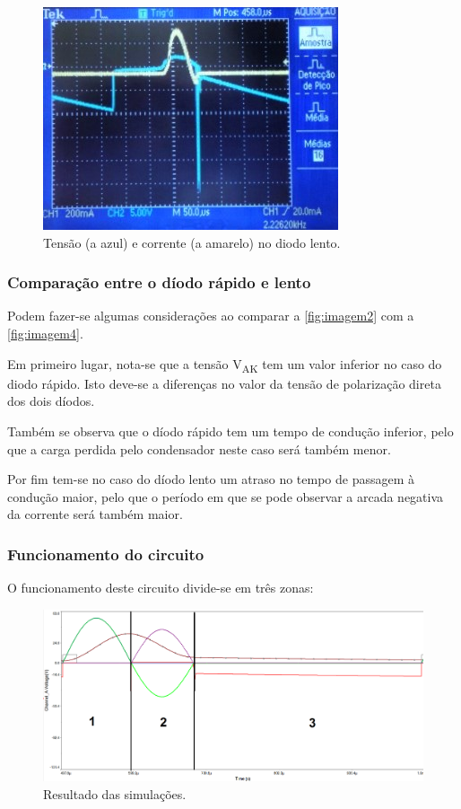 \documentclass[a4paper,11pt]{article}
\numberwithin{equation}{section}
\begin{document}
\begin{figure}[H]
	\centering
	\includegraphics[keepaspectratio=true, scale=1.2]{img/imagem4}
	\caption{Tensão (a azul) e corrente (a amarelo) no diodo lento.}
	\label{fig:imagem4}
	\vspace{-0.8em}
\end{figure}

\subsubsection{Comparação entre o díodo rápido e lento}

Podem fazer-se algumas considerações ao comparar a \autoref{fig:imagem2} com a \autoref{fig:imagem4}.

Em primeiro lugar, nota-se que a tensão V\textsubscript{AK} tem um valor inferior no caso do diodo rápido. Isto deve-se a diferenças no valor da tensão de polarização direta dos dois díodos.

Também se observa que o díodo rápido tem um tempo de condução inferior, pelo que a carga perdida pelo condensador neste caso será também menor.

Por fim tem-se no caso do díodo lento um atraso no tempo de passagem à condução maior, pelo que o período em que se pode observar a arcada negativa da corrente será também maior.

\subsubsection{Funcionamento do circuito}
O funcionamento deste circuito divide-se em três zonas:

\begin{figure}[h]
	\centering
	\includegraphics[keepaspectratio=true, scale=0.4]{img/funcionamento_tir}
	\caption{Resultado das simulações.}
	\label{fig:figura 0}
	\vspace{-0.8em}
\end{figure}
\end{document}
